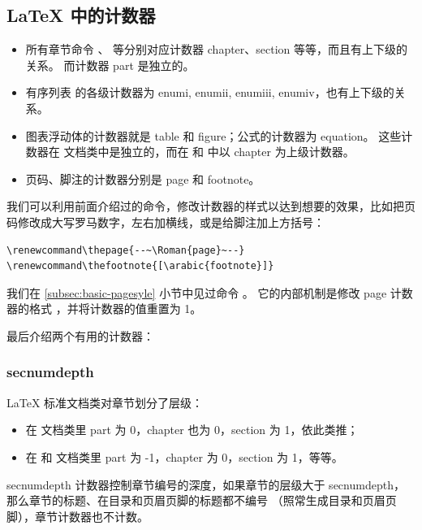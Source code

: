 \subsection{\LaTeX{} 中的计数器}\label{subsec:latex-counts}

\begin{itemize}
  \item 所有章节命令 、 等分别对应计数器 chapter、section 等等，而且有上下级的关系。
        而计数器 part 是独立的。
  \item 有序列表  的各级计数器为 enumi, enumii, enumiii, enumiv，也有上下级的关系。
  \item 图表浮动体的计数器就是 table 和 figure；公式的计数器为 equation。
        这些计数器在  文档类中是独立的，而在  和  中以 chapter 为上级计数器。
  \item 页码、脚注的计数器分别是 page 和 footnote。
\end{itemize}

我们可以利用前面介绍过的命令，修改计数器的样式以达到想要的效果，比如把页码修改成大写罗马数字，左右加横线，或是给脚注加上方括号：
\begin{verbatim}
\renewcommand\thepage{--~\Roman{page}~--}
\renewcommand\thefootnote{[\arabic{footnote}]}
\end{verbatim}

我们在 \ref{subsec:basic-pagesyle} 小节中见过命令 。
它的内部机制是修改 page 计数器的格式 ，并将计数器的值重置为 1。

最后介绍两个有用的计数器：

\subsubsection{secnumdepth}

\LaTeX{} 标准文档类对章节划分了层级：
\begin{itemize}
  \item 在  文档类里 part 为 0，chapter 也为 0，section 为 1，依此类推；
  \item 在  和  文档类里 part 为 -1，chapter 为 0，section 为 1，等等。
\end{itemize}

secnumdepth 计数器控制章节编号的深度，如果章节的层级大于 secnumdepth，那么章节的标题、在目录和页眉页脚的标题都不编号
（照常生成目录和页眉页脚），章节计数器也不计数。

